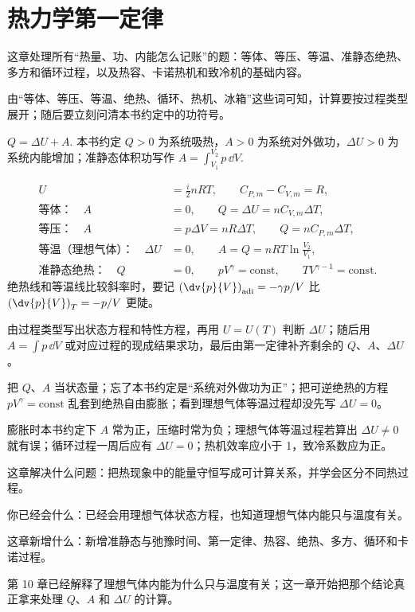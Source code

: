 \documentclass[lang=cn,11pt]{elegantbook}
\newcommand{\bridge}[1]{\begin{note}#1\end{note}}
\newcommand{\chapterroadmap}[3]{%
\begin{introduction}
 \item {\heiti 这章解决什么问题：}#1
 \item {\heiti 你已经会什么：}#2
 \item {\heiti 这章新增什么：}#3
\end{introduction}}
\begin{document}
\chapter{热力学第一定律}

\begin{skill}[第11章冲刺总手册]\label{sk:phys-ch11-overview}
 这章处理所有“热量、功、内能怎么记账”的题：等体、等压、等温、准静态绝热、多方和循环过程，以及热容、卡诺热机和致冷机的基础内容。

 由“等体、等压、等温、绝热、循环、热机、冰箱”这些词可知，计算要按过程类型展开；随后要立刻问清本书约定中的功符号。


 \(Q=\Delta U+A.\) 
本书约定 \(Q>0\) 为系统吸热，\(A>0\) 为系统对外做功，\(\Delta U>0\) 为系统内能增加；准静态体积功写作
 \(A=\int_{V_1}^{V_2}p\,\dd V.\) 


\[
\begin{aligned}
U&=\frac{i}{2}nRT,\qquad
C_{P,m}-C_{V,m}=R,\\
\text{等体：}\quad
A&=0,\qquad
Q=\Delta U=nC_{V,m}\Delta T,\\
\text{等压：}\quad
A&=p\Delta V=nR\Delta T,\qquad
Q=nC_{P,m}\Delta T,\\
\text{等温（理想气体）：}\quad
\Delta U&=0,\qquad
A=Q=nRT\ln\frac{V_2}{V_1},\\
\text{准静态绝热：}\quad
Q&=0,\qquad
pV^\gamma=\text{const},\qquad
TV^{\gamma-1}=\text{const}.
\end{aligned}
\]
绝热线和等温线比较斜率时，要记 \(\left(\dv{p}{V}\right)_{\text{adi}}=-\gamma p/V\) 比 \(\left(\dv{p}{V}\right)_T=-p/V\) 更陡。

 由过程类型写出状态方程和特性方程，再用 \(U=U(T)\) 判断 \(\Delta U\)；随后用 \(A=\int p\,\dd V\) 或对应过程的现成结果求功，最后由第一定律补齐剩余的 \(Q\)、\(A\)、\(\Delta U\)。

 把 \(Q\)、\(A\) 当状态量；忘了本书约定是“系统对外做功为正”；把可逆绝热的方程 \(pV^\gamma=\text{const}\) 乱套到绝热自由膨胀；看到理想气体等温过程却没先写 \(\Delta U=0\)。

 膨胀时本书约定下 \(A\) 常为正，压缩时常为负；理想气体等温过程若算出 \(\Delta U\neq 0\) 就有误；循环过程一周后应有 \(\Delta U=0\)；热机效率应小于 1，致冷系数应为正。
\end{skill}

\chapterroadmap
{把热现象中的能量守恒写成可计算关系，并学会区分不同热过程。}
{已经会用理想气体状态方程，也知道理想气体内能只与温度有关。}
{新增准静态与弛豫时间、第一定律、热容、绝热、多方、循环和卡诺过程。}

\bridge{第 10 章已经解释了理想气体内能为什么只与温度有关；这一章开始把那个结论真正拿来处理 \(Q\)、\(A\) 和 \(\Delta U\) 的计算。}
\end{document}
